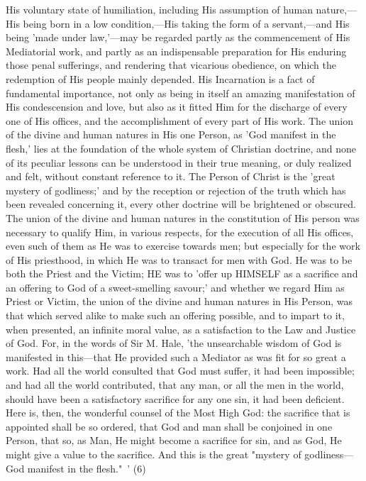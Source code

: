 \documentclass[
]{book}
\begin{document}
His voluntary state of humiliation, including His assumption of human nature,---His being born in a low condition,---His taking the form of a servant,---and His being 'made under law,'---may be regarded partly as the commencement of His Mediatorial work, and partly as an indispensable preparation for His enduring those penal sufferings, and rendering that vicarious obedience, on which the redemption of His people mainly depended. His Incarnation is a fact of fundamental importance, not only as being in itself an amazing manifestation of His condescension and love, but also as it fitted Him for the discharge of every one of His offices, and the accomplishment of every part of His work. The union of the divine and human natures in His one Person, as 'God manifest in the flesh,' lies at the foundation of the whole system of Christian doctrine, and none of its peculiar lessons can be understood in their true meaning, or duly realized and felt, without constant reference to it. The Person of Christ is the 'great mystery of godliness;' and by the reception or rejection of the truth which has been revealed concerning it, every other doctrine will be brightened or obscured. The union of the divine and human natures in the constitution of His person was necessary to qualify Him, in various respects, for the execution of all His offices, even such of them as He was to exercise towards men; but especially for the work of His priesthood, in which He was to transact for men with God. He was to be both the Priest and the Victim; HE was to 'offer up HIMSELF as a sacrifice and an offering to God of a sweet-smelling savour;' and whether we regard Him as Priest or Victim, the union of the divine and human natures in His Person, was that which served alike to make such an offering possible, and to impart to it, when presented, an infinite moral value, as a satisfaction to the Law and Justice of God. For, in the words of Sir M. Hale, 'the unsearchable wisdom of God is manifested in this---that He provided such a Mediator as was fit for so great a work. Had all the world consulted that God must suffer, it had been impossible; and had all the world contributed, that any man, or all the men in the world, should have been a satisfactory sacrifice for any one sin, it had been deficient. Here is, then, the wonderful counsel of the Most High God: the sacrifice that is appointed shall be so ordered, that God and man shall be conjoined in one Person, that so, as Man, He might become a sacrifice for sin, and as God, He might give a value to the sacrifice. And this is the great "mystery of godliness---God manifest in the flesh."~' (6)
\end{document}
